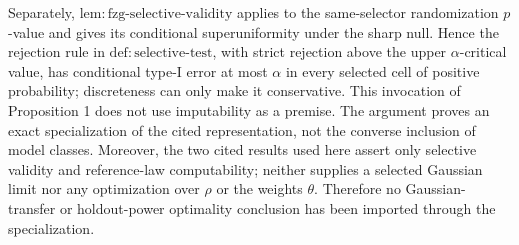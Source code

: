 Separately, \(\mathrm{lem{:}fzg\mbox{-}selective\mbox{-}validity}\) applies to the same-selector randomization \(p\)-value and gives its conditional superuniformity under the sharp null.  Hence the rejection rule in \(\mathrm{def{:}selective\mbox{-}test}\), with strict rejection above the upper \(\alpha\)-critical value, has conditional type-I error at most \(\alpha\) in every selected cell of positive probability; discreteness can only make it conservative.  This invocation of Proposition 1 does not use imputability as a premise.  The argument proves an exact specialization of the cited representation, not the converse inclusion of model classes.  Moreover, the two cited results used here assert only selective validity and reference-law computability; neither supplies a selected Gaussian limit nor any optimization over \(\rho\) or the weights \(\theta\).  Therefore no Gaussian-transfer or holdout-power optimality conclusion has been imported through the specialization.
